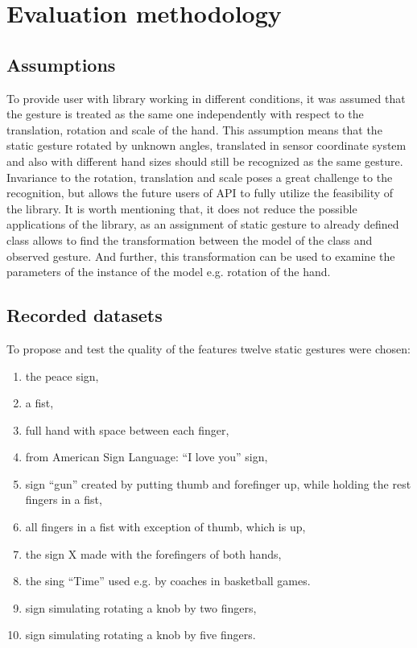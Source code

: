 \section{Evaluation methodology}

\subsection{Assumptions}
To provide user with library working in different conditions, it was assumed that the gesture is treated as the same one independently with respect to the translation, rotation and scale of the hand. 
This assumption means that the static gesture rotated by unknown angles, translated in sensor coordinate system and also with different hand sizes should still be recognized as the same gesture.
Invariance to the rotation, translation and scale poses a great challenge to the recognition, but allows the future users of API to fully utilize the feasibility of the library.
It is worth mentioning that, it does not reduce the possible applications of the library, as an assignment of static gesture to already defined class allows to find the transformation between the model of the class and observed gesture.
And further, this transformation can be used to examine the parameters of the instance of the model e.g. rotation of the hand.

\subsection{Recorded datasets}

To propose and test the quality of the features twelve static gestures were chosen:
\begin{enumerate}
\item the peace sign,
\item a fist,
\item full hand with space between each finger,
\item from American Sign Language: ``I love you'' sign,
\item sign ``gun'' created by putting thumb and forefinger up, while holding the rest fingers in a fist,
\item all fingers in a fist with exception of thumb, which is up,
\item the sign X made with the forefingers of both hands,
\item the sing ``Time'' used e.g. by coaches in basketball games.
\item sign simulating rotating a knob by two fingers,
\item sign simulating rotating a knob by five fingers.
\end{enumerate} 

